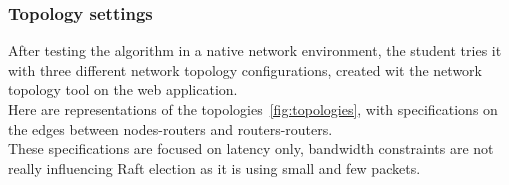 \documentclass{eplmastersthesis}
\begin{document}
        \subsubsection{Topology settings}

          After testing the algorithm in a native network environment,
          the student tries it with three different network
          topology configurations, created wit the network topology tool on
          the web application.\\
          Here are representations of the topologies~\ref{fig:topologies},
          with specifications on the edges between nodes-routers and
          routers-routers.\\
          These specifications are focused on latency only,
          bandwidth constraints are not really influencing Raft election as
          it is using small and few packets.
\end{document}
